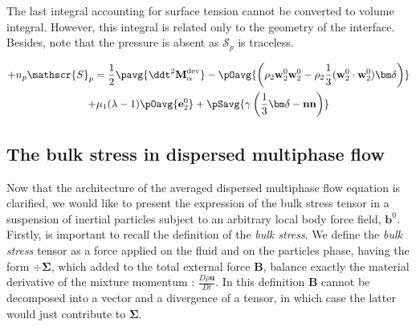 The last integral accounting for surface tension cannot be converted to volume integral. 
However, this integral is related only to the geometry of the interface. 
Besides, note that the pressure is absent as $\mathscr{S}_p$ is traceless. 

\begin{multline}    
    + n_p \mathscr{S}_p
    =
    \frac{1}{2}\pavg{\ddt^2{\textbf{M}_\alpha^\text{dev}}}
    - \pOavg{\left(
    \rho_2\textbf{w}_2^0 \textbf{w}_2^0
    - \rho_2\frac{1}{3}(\textbf{w}_2^0 \cdot \textbf{w}_2^0)\bm\delta\right)}\\
    + \mu_1 (\lambda - 1)\pOavg{\textbf{e}_2^0}
    + \pSavg{\gamma\left(\frac{1}{3}\bm\delta-\textbf{nn}\right)}\\
\end{multline}



\subsection{The bulk stress in dispersed multiphase flow}



Now that the architecture of the averaged dispersed multiphase flow equation is clarified, we would like to present the expression of the bulk stress tensor in a suspension of inertial particles subject to an arbitrary local body force field, $\textbf{b}^0$.
Firstly, is important to recall the definition of the \textit{bulk stress}. 
We define the \textit{bulk stress} tensor as a force applied on the fluid and on the particles phase, having the form $\div \bm{\Sigma}$, which added to the total external force $\textbf{B}$, balance exactly the material derivative of the mixture momentum : $\frac{D \rho \textbf{u}}{Dt}$. 
In this definition $\textbf{B}$ cannot be decomposed into a vector and a divergence of a tensor, in which case the latter would just contribute to $\bm{\Sigma}$.

